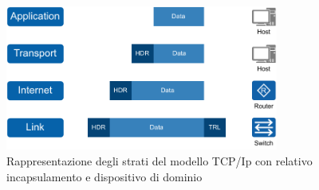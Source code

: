 \begin{figure}[H]
    \centering
    \includegraphics[width=0.8\textwidth]{immagini/diag2-modello_a_strati}
    \caption{Rappresentazione degli strati del modello TCP/Ip con relativo incapsulamento e dispositivo di dominio}
\end{figure}




